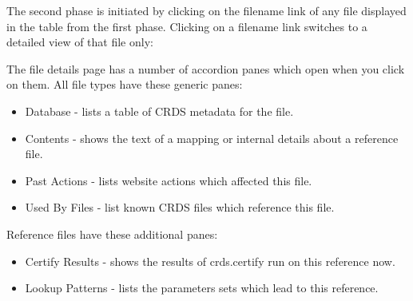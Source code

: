 \documentclass[letterpaper,10pt,english]{sphinxmanual}
\begin{document}
The second phase is initiated by clicking on the filename link of any file
displayed in the table from the first phase.   Clicking on a filename link switches
to a detailed view of that file only:
\begin{figure}[htbp]
\centering

\end{figure}

The file details page has a number of accordion panes which open when you
click on them.  All file types have these generic panes:
\begin{itemize}
\item {} 
Database - lists a table of CRDS metadata for the file.

\item {} 
Contents - shows the text of a mapping or internal details about a reference file.

\item {} 
Past Actions  - lists website actions which affected this file.

\item {} 
Used By Files - list known CRDS files which reference this file.

\end{itemize}

Reference files have these additional panes:
\begin{itemize}
\item {} 
Certify Results - shows the results of crds.certify run on this reference now.

\item {} 
Lookup Patterns - lists the parameters sets which lead to this reference.

\end{itemize}
\end{document}
